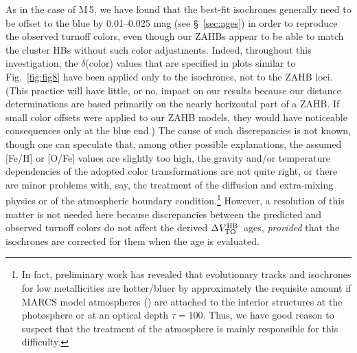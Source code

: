 \documentclass[12pt,preprint]{aastex}
\newcommand\teff{{T_{\rm eff}}}
\newcommand\delv{\Delta V^{\rm HB}_{\rm TO}}
\begin{document}
As in the case of M$\,$5, we have found that the best-fit isochrones generally
need to be offset to the blue by 0.01--0.025 mag (see \S~\ref{sec:ages}) in
order to reproduce the observed turnoff colors, even though our ZAHBs appear to
be able to match the cluster HBs without such color adjustments.  Indeed,
throughout this investigation, the $\delta$(color) values that are specified in
plots similar to Fig.~\ref{fig:fig8} have been applied only to the isochrones,
not to the ZAHB loci.  (This practice will have little, or no, impact on our
results because our distance determinations are based primarily on the nearly
horizontal part of a ZAHB.  If small color offsets were applied to our ZAHB
models, they would have noticeable consequences only at the blue end.)  The
cause of such discrepancies is not known, though one can speculate that, among
other possible explanations, the assumed [Fe/H] or [O/Fe] values are slightly
too high, the gravity and/or temperature dependencies of the adopted color
transformations are not quite right, or there are minor problems with, say, the
treatment of the diffusion and extra-mixing physics or of the atmospheric
boundary condition.\footnote{In fact, preliminary work has revealed that 
evolutionary tracks and isochrones for low metallicities are hotter/bluer by
approximately the requisite amount if MARCS model atmospheres (\citealt{gee08})
are attached to the interior structures at the photosphere or at an optical
depth $\tau = 100$.  Thus, we have good reason to suspect that the treatment
of the atmosphere is mainly responsible for this difficulty.}  However, a
resolution of this matter is not needed here because discrepancies between the
predicted and observed turnoff colors do not affect the derived $\delv$\ ages,
{\it provided} that the isochrones are corrected for them when the age is
evaluated. 
\end{document}
